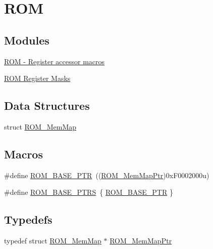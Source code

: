 \hypertarget{group___r_o_m___peripheral}{}\section{R\+O\+M}
\label{group___r_o_m___peripheral}
\subsection*{Modules}
\begin{DoxyCompactItemize}
\item 
\hyperlink{group___r_o_m___register___accessor___macros}{R\+O\+M -\/ Register accessor macros}
\item 
\hyperlink{group___r_o_m___register___masks}{R\+O\+M Register Masks}
\end{DoxyCompactItemize}
\subsection*{Data Structures}
\begin{DoxyCompactItemize}
\item 
struct \hyperlink{struct_r_o_m___mem_map}{R\+O\+M\+\_\+\+Mem\+Map}
\end{DoxyCompactItemize}
\subsection*{Macros}
\begin{DoxyCompactItemize}
\item 
\#define \hyperlink{group___r_o_m___peripheral_ga5ad426d10b6832ca7012e8767113f686}{R\+O\+M\+\_\+\+B\+A\+S\+E\+\_\+\+P\+T\+R}~((\hyperlink{group___r_o_m___peripheral_ga443285c54b394d010d2dccd28607e4b4}{R\+O\+M\+\_\+\+Mem\+Map\+Ptr})0x\+F0002000u)
\item 
\#define \hyperlink{group___r_o_m___peripheral_ga41e000a3e59f16dd8f395cebcb883e82}{R\+O\+M\+\_\+\+B\+A\+S\+E\+\_\+\+P\+T\+R\+S}~\{ \hyperlink{group___r_o_m___peripheral_ga5ad426d10b6832ca7012e8767113f686}{R\+O\+M\+\_\+\+B\+A\+S\+E\+\_\+\+P\+T\+R} \}
\end{DoxyCompactItemize}
\subsection*{Typedefs}
\begin{DoxyCompactItemize}
\item 
typedef struct \hyperlink{struct_r_o_m___mem_map}{R\+O\+M\+\_\+\+Mem\+Map} $\ast$ \hyperlink{group___r_o_m___peripheral_ga443285c54b394d010d2dccd28607e4b4}{R\+O\+M\+\_\+\+Mem\+Map\+Ptr}
\end{DoxyCompactItemize}


